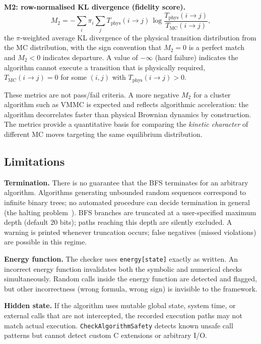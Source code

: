 \documentclass[twocolumn,10pt]{article}
\begin{document}
\medskip\noindent\textbf{M2: row-normalised KL divergence (fidelity score).}
\begin{equation}
  M_2 = -\sum_i \pi_i \sum_j T_\mathrm{phys}(i\to j)\,
  \log\frac{T_\mathrm{phys}(i\to j)}{T_\mathrm{MC}(i\to j)},
  \label{eq:M2}
\end{equation}
the $\pi$-weighted average KL divergence of the physical transition
distribution from the MC distribution, with the sign convention that $M_2=0$
is a perfect match and $M_2<0$ indicates departure.  A value of $-\infty$
(hard failure) indicates the algorithm cannot execute a transition that is
physically required, $T_\mathrm{MC}(i\to j)=0$ for some $(i,j)$ with
$T_\mathrm{phys}(i\to j)>0$.

These metrics are not pass/fail criteria.  A more negative $M_2$ for a
cluster algorithm such as VMMC is expected and reflects algorithmic
acceleration: the algorithm decorrelates faster than physical Brownian
dynamics by construction.  The metrics provide a quantitative basis for
comparing the \emph{kinetic character} of different MC moves targeting the
same equilibrium distribution.

\subsection{Limitations}
\label{sec:limitations}

\medskip\noindent\textbf{Termination.}
There is no guarantee that the BFS terminates for an arbitrary algorithm.
Algorithms generating unbounded random sequences correspond to infinite binary
trees; no automated procedure can decide termination in general (the halting
problem~\cite{Turing1936}).  BFS branches are truncated at a user-specified
maximum depth (default 20 bits); paths reaching this depth are silently
excluded.  A warning is printed whenever truncation occurs; false negatives
(missed violations) are possible in this regime.

\medskip\noindent\textbf{Energy function.}
The checker uses \texttt{energy[state]} exactly as written.  An incorrect
energy function invalidates both the symbolic and numerical checks
simultaneously.  Random calls inside the energy function are detected and
flagged, but other incorrectness (wrong formula, wrong sign) is invisible to
the framework.

\medskip\noindent\textbf{Hidden state.}
If the algorithm uses mutable global state, system time, or external calls
that are not intercepted, the recorded execution paths may not match actual
execution.  \texttt{CheckAlgorithmSafety} detects known unsafe call patterns
but cannot detect custom C extensions or arbitrary I/O.
\end{document}
